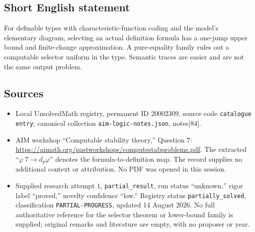 \documentclass[11pt]{article}
\begin{document}
\subsection{Short English statement}
For definable types with characteristic-function coding and the model's elementary diagram, selecting an actual definition formula has a one-jump upper bound and finite-change approximation. A pure-equality family rules out a computable selector uniform in the type. Semantic traces are easier and are not the same output problem.
\subsection{Sources}
\begin{itemize}
\item Local UnsolvedMath registry, permanent ID \(20002309\), source code \texttt{catalogue entry}; canonical collection \texttt{aim-logic-notes.json}, notes[84].
\item AIM workshop ``Computable stability theory,'' Question \(7\): \url{https://aimath.org/pastworkshops/computestabproblems.pdf}. The extracted ``\(\varphi\ 7\to d_p\varphi\)'' denotes the formula-to-definition map. The record supplies no additional context or attribution. No PDF was opened in this session.
\item Supplied research attempt \(1\), \texttt{partial\_result}, run status ``unknown,'' rigor label ``proved,'' novelty confidence ``low.'' Registry status \texttt{partially\_solved}, classification \texttt{PARTIAL-PROGRESS}, updated 14 August 2026. No full authoritative reference for the selector theorem or lower-bound family is supplied; original remarks and literature are empty, with no proposer or year.
\end{itemize}
\end{document}
